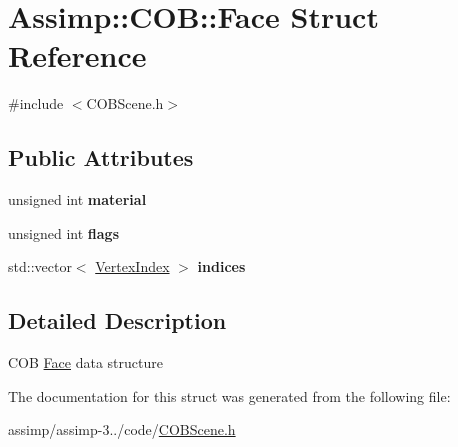\hypertarget{struct_assimp_1_1_c_o_b_1_1_face}{\section{Assimp\+:\+:C\+O\+B\+:\+:Face Struct Reference}
\label{struct_assimp_1_1_c_o_b_1_1_face}
}


{\ttfamily \#include $<$C\+O\+B\+Scene.\+h$>$}

\subsection*{Public Attributes}
\begin{DoxyCompactItemize}
\item 
\hypertarget{struct_assimp_1_1_c_o_b_1_1_face_a2ead6f75800193b68805eb886109fae8}{unsigned int {\bfseries material}}\label{struct_assimp_1_1_c_o_b_1_1_face_a2ead6f75800193b68805eb886109fae8}

\item 
\hypertarget{struct_assimp_1_1_c_o_b_1_1_face_a7b46080ca7e5fca52392af51773e7e9f}{unsigned int {\bfseries flags}}\label{struct_assimp_1_1_c_o_b_1_1_face_a7b46080ca7e5fca52392af51773e7e9f}

\item 
\hypertarget{struct_assimp_1_1_c_o_b_1_1_face_a752904c23677a6e27f18b95cb75b4819}{std\+::vector$<$ \hyperlink{struct_assimp_1_1_c_o_b_1_1_vertex_index}{Vertex\+Index} $>$ {\bfseries indices}}\label{struct_assimp_1_1_c_o_b_1_1_face_a752904c23677a6e27f18b95cb75b4819}

\end{DoxyCompactItemize}


\subsection{Detailed Description}
C\+O\+B \hyperlink{struct_assimp_1_1_c_o_b_1_1_face}{Face} data structure 

The documentation for this struct was generated from the following file\+:\begin{DoxyCompactItemize}
\item 
assimp/assimp-\/3../code/\hyperlink{_c_o_b_scene_8h}{C\+O\+B\+Scene.\+h}\end{DoxyCompactItemize}
